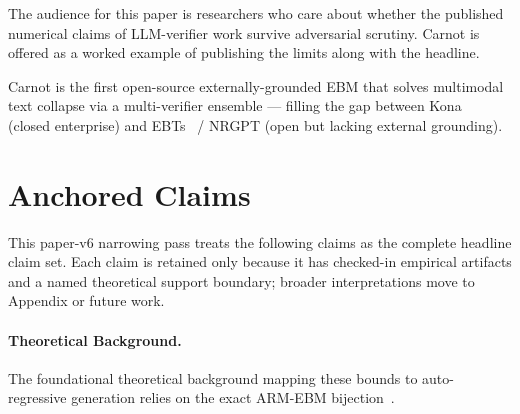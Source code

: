 \documentclass[10pt]{article}
\begin{document}
The audience for this paper is researchers who care about whether
the published numerical claims of LLM-verifier work survive
adversarial scrutiny. Carnot is offered as a worked example of
publishing the limits along with the headline.

Carnot is the first open-source externally-grounded EBM that solves
multimodal text collapse via a multi-verifier ensemble --- filling
the gap between Kona~\cite{logicalintelligence2026kona} (closed
enterprise) and EBTs~\cite{gladstone2025ebt} / NRGPT (open but
lacking external grounding).

\section{Anchored Claims}
\label{sec:anchored-claims}

This paper-v6 narrowing pass treats the following claims as the complete headline claim set. Each claim is retained only because it has checked-in empirical artifacts and a named theoretical support boundary; broader interpretations move to Appendix or future work.

\paragraph{Theoretical Background.} The foundational theoretical background mapping these bounds to auto-regressive generation relies on the exact ARM-EBM bijection~\cite{blondel2025arm}.
\end{document}
